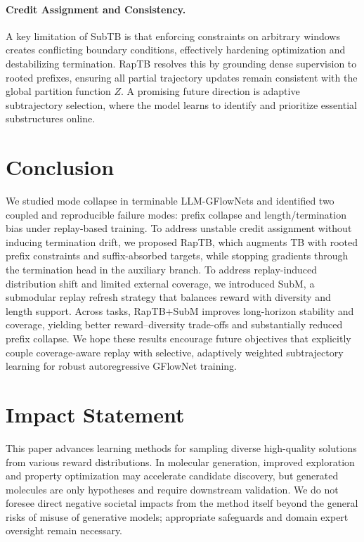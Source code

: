\documentclass{article}
\theoremstyle{plain}
\theoremstyle{definition}
\theoremstyle{remark}
\begin{document}
\paragraph{Credit Assignment and Consistency.}
A key limitation of SubTB is that enforcing constraints on arbitrary windows creates conflicting boundary conditions, effectively hardening optimization and destabilizing termination. RapTB resolves this by grounding dense supervision to rooted prefixes, ensuring all partial trajectory updates remain consistent with the global partition function $Z$. A promising future direction is adaptive subtrajectory selection, where the model learns to identify and prioritize essential substructures online.

\section{Conclusion}
We studied mode collapse in terminable LLM-GFlowNets and identified two coupled and reproducible failure modes: prefix collapse and length/termination bias under replay-based training.
To address unstable credit assignment without inducing termination drift, we proposed RapTB, which augments TB with rooted prefix constraints and suffix-absorbed targets, while stopping gradients through the termination head in the auxiliary branch.
To address replay-induced distribution shift and limited external coverage, we introduced SubM, a submodular replay refresh strategy that balances reward with diversity and length support.
Across tasks, RapTB+SubM improves long-horizon stability and coverage, yielding better reward--diversity trade-offs and substantially reduced prefix collapse.
We hope these results encourage future objectives that explicitly couple coverage-aware replay with selective, adaptively weighted subtrajectory learning for robust autoregressive GFlowNet training.


\section*{Impact Statement}
This paper advances learning methods for sampling diverse high-quality solutions from various reward distributions.
In molecular generation, improved exploration and property optimization may accelerate candidate discovery, but generated molecules are only hypotheses and require downstream validation.
We do not foresee direct negative societal impacts from the method itself beyond the general risks of misuse of generative models; appropriate safeguards and domain expert oversight remain necessary.
\end{document}
